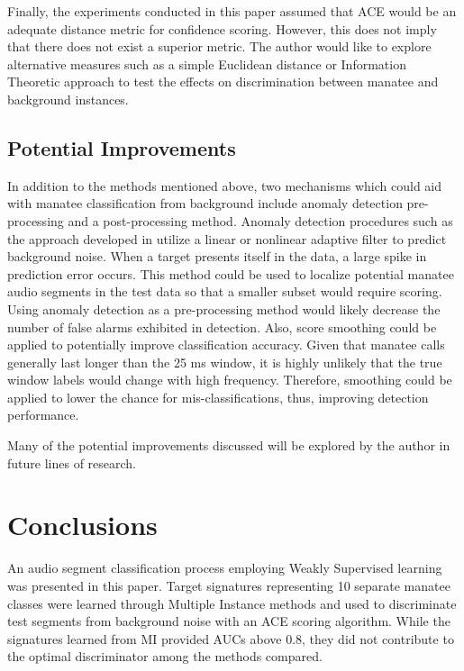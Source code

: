\documentclass[conference]{IEEEtran}
\begin{document}
Finally, the experiments conducted in this paper assumed that ACE would be an adequate distance metric for confidence scoring.  However, this does not imply that there does not exist a superior metric.  The author would like to explore alternative measures such as a simple Euclidean distance or Information Theoretic approach to test the effects on  discrimination between manatee and background instances.  


\subsection{Potential Improvements}

In addition to the methods mentioned above, two mechanisms which could aid with manatee classification from background include anomaly detection pre-processing and a post-processing method.  Anomaly detection procedures such as the approach developed in \cite{LinearPrediction} utilize a linear or nonlinear adaptive filter to predict background noise.  When a target presents itself in the data, a large spike in prediction error occurs.  This method could be used to localize potential manatee audio segments in the test data so that a smaller subset would require scoring.  Using anomaly detection as a pre-processing method would likely decrease the number of false alarms exhibited in detection.  Also, score smoothing could be applied to potentially improve classification accuracy.  Given that manatee calls generally last longer than the 25 ms window, it is highly unlikely that the true window labels would change with high frequency.  Therefore, smoothing could be applied to lower the chance for mis-classifications, thus, improving detection performance.

Many of the potential improvements discussed will be explored by the author in future lines of research.

\section{Conclusions} \label{Conclusions}
An audio segment classification process employing Weakly Supervised learning was presented in this paper.  Target signatures representing 10 separate manatee classes were learned through Multiple Instance methods and used to discriminate test segments from background noise with an ACE scoring algorithm.  While the signatures learned from MI provided AUCs above 0.8, they did not contribute to the optimal discriminator among the methods compared. 
\end{document}
